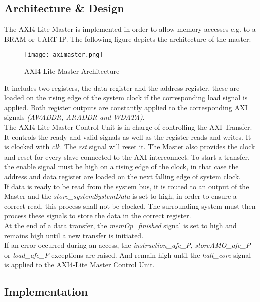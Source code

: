\subsection{Architecture \& Design}
The AXI4-Lite Master is implemented in order to allow memory accesses e.g. to a
BRAM or UART IP. The following figure depicts the architecture of the master:
\begin{figure}[H]
	\centering
	\texttt{[image: aximaster.png]}
	\caption{AXI4-Lite Master Architecture}
	\label{fig:aximaster}
\end{figure}
It includes two registers, the data register and the address register, these are loaded on the rising edge of the system clock if the corresponding load signal is applied. Both register outputs are constantly applied to the corresponding AXI signals \textit{(AWADDR, ARADDR and WDATA)}.\\
The AXI4-Lite Master Control Unit is in charge of controlling the AXI Transfer. It
controls the ready and valid signals as well as the register reads and writes. It is
clocked with \textit{clk}. The \textit{rst} signal will reset it. The Master also provides the clock and reset for every slave connected to the AXI interconnect. To start a transfer, the enable signal must be high on a rising edge of the clock, in that case the address and data register are loaded on the next falling edge of system clock.\\
If data is ready to be read from the system bus, it is routed to an output of the Master and the \textit{store\_systemSystemData} is set to high, in order to ensure a correct read, this process shall not be clocked. The surrounding system must then process these signals to store the data in the correct register.\\
At the end of a data transfer, the \textit{memOp\_finished} signal is set to high and remains high until a new transfer is initiated.\\
If an error occurred during an access, the \textit{instruction\_afe\_P}, \textit{storeAMO\_afe\_P} or \textit{load\_afe\_P} exceptions are raised. And remain high until the \textit{halt\_core} signal is applied to the AXI4-Lite Master Control Unit.
\subsection{Implementation}


